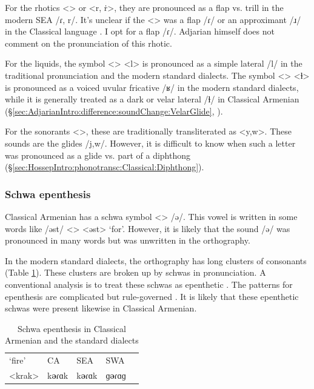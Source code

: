 For the rhotics <> or <r, ṙ>, they are pronounced as a flap vs. trill in the modern SEA /ɾ, r/. It's unclear if the <> was a flap /ɾ/ or an approximant /ɹ/ in the Classical language \citep[1040]{Macak-2017-PhonoClassicalArmenian}. I opt for a flap /ɾ/. Adjarian himself does not comment on the pronunciation of this rhotic. 


For the liquids, the symbol <> <l> is pronounced as a simple lateral /l/ in the traditional pronunciation and the modern standard dialects. The symbol <> <ɫ> is pronounced as a voiced uvular fricative /ʁ/ in the modern standard dialects, while it is generally treated as a dark or velar lateral /ɫ/ in Classical Armenian (\S\ref{sec:AdjarianIntro:difference:soundChange:VelarGlide}, \citealt[ch2]{Macak-2016-StudiesClassicalModernArmenianPhono}).

For the sonorants <>, these are traditionally transliterated as <y,w>. These sounds are the glides /j,w/. However, it is difficult to know when such a letter was pronounced as a glide vs. part of a diphthong (\S\ref{sec:HossepIntro:phonotransc:Classical:Diphthong}). 

\subsubsection{Schwa epenthesis}\label{sec:HossepIntro:phonotransc:CA:schwa}


Classical Armenian has a schwa symbol <> /ə/. This vowel is written in some words like /əst/ <> <əst> `for'. However, it is likely that the sound /ə/ was pronounced in many words but was unwritten in the orthography. 

In the modern standard dialects, the orthography has long clusters of consonants (Table \ref{tab:HossepIntro:schwaEpen}). These clusters are broken up by schwas in pronunciation. A conventional analysis is to treat these schwas as epenthetic \citep{Vaux-1998-ArmenianPhono}. The patterns for epenthesis are complicated but rule-governed \citep[cf.][]{Dolatian-prep-Schwa}. It is likely that these epenthetic schwas were present likewise in Classical Armenian. 



\begin{table}[H]
	\caption{Schwa epenthesis in Classical Armenian and the standard dialects} \label{tab:HossepIntro:schwaEpen}
	\centering 
	\begin{tabular}{|l| lll| l| }
		\hline `fire'	& CA & SEA & SWA & \\
		<krak> & k\textbf{ə}ɾɑk &k\textbf{ə}ɾɑk &ɡ\textbf{ə}ɾɑɡ & \armenian{կրակ}
		\\\hline 
	\end{tabular}
\end{table}

